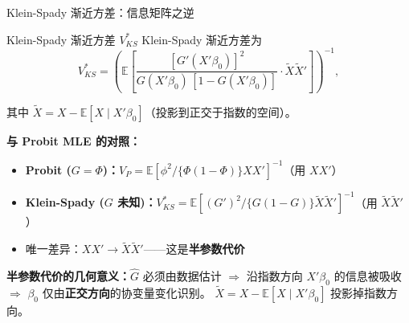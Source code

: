 \documentclass[aspectratio=169, 10pt]{beamer}
\begin{document}
\begin{frame}{Klein-Spady 渐近方差：信息矩阵之逆}

  \begin{definitionbox}{{Klein-Spady 渐近方差 $V^{*}_{KS}$}}
    Klein-Spady 渐近方差为
    $$V^{*}_{KS} = \left(\mathbb{E}\!\left[
    \frac{[G'(X'\beta_0)]^2}{G(X'\beta_0)\,[1 - G(X'\beta_0)]}
    \cdot \tilde X \tilde X'\right]\right)^{-1},$$

    其中 $\tilde X = X - \mathbb{E}[X \mid X'\beta_0]$（投影到正交于指数的空间）。
  \end{definitionbox}

  \begin{highlightbox}
    \textbf{与 Probit MLE 的对照：}
    \begin{itemize}\setlength{\itemsep}{1pt}
      \item \textbf{Probit ($G = \Phi$)：}$V_{P} = \mathbb{E}[\phi^2/\{\Phi(1-\Phi)\} X X']^{-1}$（用 $X X'$）
      \item \textbf{Klein-Spady ($G$ 未知)：}$V^{*}_{KS} = \mathbb{E}[(G')^2/\{G(1-G)\} \tilde X \tilde X']^{-1}$（用 $\tilde X \tilde X'$）
      \item 唯一差异：$X X' \to \tilde X \tilde X'$——这是\textbf{半参数代价}
    \end{itemize}
  \end{highlightbox}

  \begin{keybox}
    \textbf{半参数代价的几何意义：}$\hat G$ 必须由数据估计 $\Rightarrow$ 沿指数方向 $X'\beta_0$ 的信息被吸收 $\Rightarrow$ $\beta_0$ 仅由\textbf{正交方向}的协变量变化识别。
    $\tilde X = X - \mathbb{E}[X \mid X'\beta_0]$ 投影掉指数方向。
  \end{keybox}

\end{frame}
\end{document}
